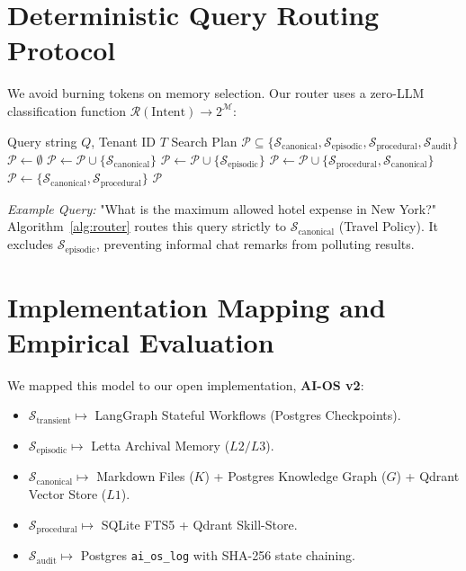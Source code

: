 \documentclass[10pt,journal,compsoc]{IEEEtran}
\begin{document}
\section{Deterministic Query Routing Protocol}
\label{sec:routing}

We avoid burning tokens on memory selection. Our router uses a zero-LLM classification function $\mathcal{R}(\text{Intent}) \rightarrow 2^{\mathcal{M}}$:

\begin{algorithm}[h]
\caption{Deterministic Query Routing Protocol}
\label{alg:router}
\begin{algorithmic}[1]
\REQUIRE Query string $Q$, Tenant ID $T$
\ENSURE Search Plan $\mathcal{P} \subseteq \{\mathcal{S}_{\text{canonical}}, \mathcal{S}_{\text{episodic}}, \mathcal{S}_{\text{procedural}}, \mathcal{S}_{\text{audit}}\}$
\STATE $\mathcal{P} \leftarrow \emptyset$
    \STATE $\mathcal{P} \leftarrow \mathcal{P} \cup \{\mathcal{S}_{\text{canonical}}\}$
    \STATE $\mathcal{P} \leftarrow \mathcal{P} \cup \{\mathcal{S}_{\text{episodic}}\}$
    \STATE $\mathcal{P} \leftarrow \mathcal{P} \cup \{\mathcal{S}_{\text{procedural}}, \mathcal{S}_{\text{canonical}}\}$
\ELSE
    \STATE $\mathcal{P} \leftarrow \{\mathcal{S}_{\text{canonical}}, \mathcal{S}_{\text{procedural}}\}$ 
\ENDIF
\RETURN $\mathcal{P}$
\end{algorithmic}
\end{algorithm}

\emph{Example Query:} "What is the maximum allowed hotel expense in New York?" Algorithm~\ref{alg:router} routes this query strictly to $\mathcal{S}_{\text{canonical}}$ (Travel Policy). It excludes $\mathcal{S}_{\text{episodic}}$, preventing informal chat remarks from polluting results.

\section{Implementation Mapping and Empirical Evaluation}
\label{sec:evaluation}

We mapped this model to our open implementation, \textbf{AI-OS v2}:
\begin{itemize}
    \item $\mathcal{S}_{\text{transient}} \mapsto$ LangGraph Stateful Workflows (Postgres Checkpoints).
    \item $\mathcal{S}_{\text{episodic}} \mapsto$ Letta Archival Memory ($L2/L3$).
    \item $\mathcal{S}_{\text{canonical}} \mapsto$ Markdown Files ($K$) + Postgres Knowledge Graph ($G$) + Qdrant Vector Store ($L1$).
    \item $\mathcal{S}_{\text{procedural}} \mapsto$ SQLite FTS5 + Qdrant Skill-Store.
    \item $\mathcal{S}_{\text{audit}} \mapsto$ Postgres \texttt{ai\_os\_log} with SHA-256 state chaining.
\end{itemize}
\end{document}
